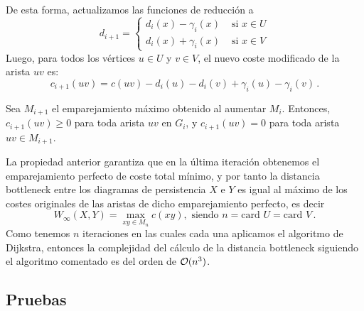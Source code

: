 De esta forma, actualizamos las funciones de reducción a
\[
d_{i+1} = \begin{cases}
d_i(x) - \gamma_i(x) & \text{ si } x \in U \\ 
d_i(x) + \gamma_i(x) & \text{ si } x \in V 
\end{cases}
\]
Luego, para todos los vértices $u \in U$ y $v \in V$, el nuevo coste modificado de la arista $uv$ es:
\[
c_{i+1}(uv)=c(uv) - d_i(u) - d_i(v) + \gamma_i(u) - \gamma_i(v)\,.
\]

\begin{property}
Sea $M_{i+1}$ el emparejamiento máximo obtenido al aumentar $M_i$. Entonces, $c_{i+1}(uv) \geq 0$ para toda arista $uv$ en $G_i$, y  $c_{i+1}(uv) = 0$ para toda arista $uv \in M_{i+1}$.
\end{property}

La propiedad anterior garantiza que en la última iteración obtenemos el emparejamiento perfecto de coste total mínimo, y por tanto la distancia bottleneck entre los diagramas de persistencia $X$ e $Y$ es igual al máximo de los costes originales de las aristas de dicho emparejamiento perfecto, es decir
\[W_\infty(X,Y)=\max_{xy \in M_n} c(xy),\text{ siendo } n= \text{card } U = \text{card } V\,.
\]
Como tenemos $n$ iteraciones en las cuales cada una aplicamos el algoritmo de Dijkstra, entonces la complejidad del cálculo de la distancia bottleneck siguiendo el algoritmo comentado es del orden de $\mathcal{O}(n^3)$.

\subsection{Pruebas}





























